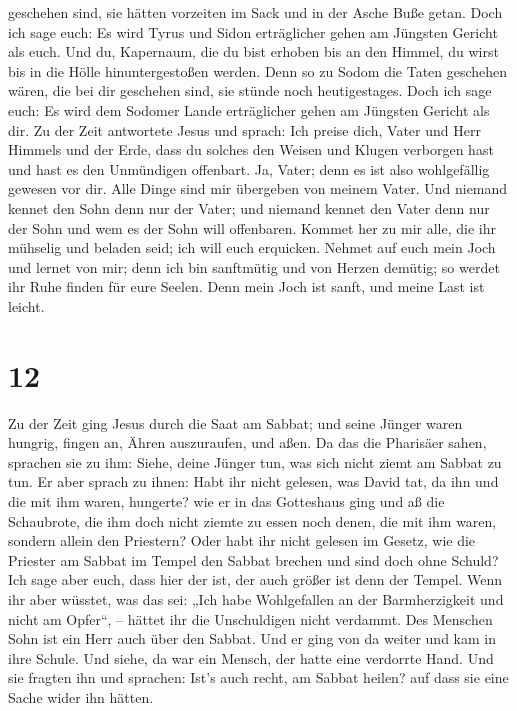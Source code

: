 geschehen sind, sie hätten vorzeiten im Sack und in der Asche Buße
getan.  Doch ich sage euch: Es wird Tyrus und Sidon
erträglicher gehen am Jüngsten Gericht als euch.  Und du,
Kapernaum, die du bist erhoben bis an den Himmel, du wirst bis in die
Hölle hinuntergestoßen werden. Denn so zu Sodom die Taten geschehen
wären, die bei dir geschehen sind, sie stünde noch heutigestages.
 Doch ich sage euch: Es wird dem Sodomer Lande
erträglicher gehen am Jüngsten Gericht als dir.  Zu der
Zeit antwortete Jesus und sprach: Ich preise dich, Vater und Herr
Himmels und der Erde, dass du solches den Weisen und Klugen verborgen
hast und hast es den Unmündigen offenbart.  Ja, Vater;
denn es ist also wohlgefällig gewesen vor dir.  Alle
Dinge sind mir übergeben von meinem Vater. Und niemand kennet den Sohn
denn nur der Vater; und niemand kennet den Vater denn nur der Sohn und
wem es der Sohn will offenbaren.  Kommet her zu mir alle,
die ihr mühselig und beladen seid; ich will euch erquicken.
 Nehmet auf euch mein Joch und lernet von mir; denn ich
bin sanftmütig und von Herzen demütig; so werdet ihr Ruhe finden für
eure Seelen.  Denn mein Joch ist sanft, und meine Last
ist leicht.

\hypertarget{section-11}{%
\section{12}\label{section-11}}

 Zu der Zeit ging Jesus durch die Saat am Sabbat; und
seine Jünger waren hungrig, fingen an, Ähren auszuraufen, und aßen.
 Da das die Pharisäer sahen, sprachen sie zu ihm: Siehe,
deine Jünger tun, was sich nicht ziemt am Sabbat zu tun. 
Er aber sprach zu ihnen: Habt ihr nicht gelesen, was David tat, da ihn
und die mit ihm waren, hungerte?  wie er in das Gotteshaus
ging und aß die Schaubrote, die ihm doch nicht ziemte zu essen noch
denen, die mit ihm waren, sondern allein den Priestern? 
Oder habt ihr nicht gelesen im Gesetz, wie die Priester am Sabbat im
Tempel den Sabbat brechen und sind doch ohne Schuld?  Ich
sage aber euch, dass hier der ist, der auch größer ist denn der Tempel.
 Wenn ihr aber wüsstet, was das sei: „Ich habe
Wohlgefallen an der Barmherzigkeit und nicht am Opfer``, -- hättet ihr
die Unschuldigen nicht verdammt.  Des Menschen Sohn ist
ein Herr auch über den Sabbat.  Und er ging von da weiter
und kam in ihre Schule.  Und siehe, da war ein Mensch,
der hatte eine verdorrte Hand. Und sie fragten ihn und sprachen: Ist's
auch recht, am Sabbat heilen? auf dass sie eine Sache wider ihn hätten.

